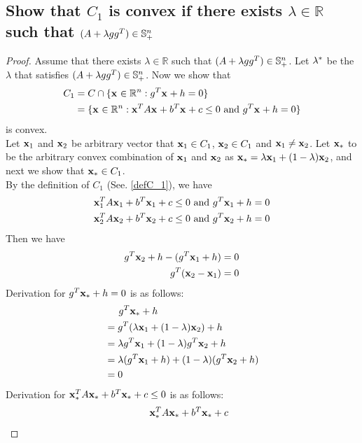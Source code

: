 \documentclass[11pt,a4paper]{article}
\begin{document}
\subsection{Show that $C_1$ is convex if there exists $\lambda \in
    \mathbb{R}$ such that $(A + \lambda gg^T) \in \mathbb{S}_{+}^{n}$}
\begin{proof}
    Assume that there exists $\lambda \in \mathbb{R}$ such that $(A + \lambda gg^T) \in \mathbb{S}_{+}^{n}$.
    Let $\lambda^{*}$ be the $\lambda$ that satisfies $(A + \lambda gg^T) \in \mathbb{S}_{+}^{n}$.
    Now we show that 
    \begin{align}
        C_1 &= C \cap \{\mathbf{x}_{} \in \mathbb{R}^{n}: g^T \mathbf{x}_{} + h = 0\} \\
        &=  \{\mathbf{x}_{} \in \mathbb{R}^{n}: \mathbf{x}_{}^{T} A \mathbf{x}_{} + b^T \mathbf{x}_{} + c \leq 0 \text{ and } g^T \mathbf{x}_{} + h = 0\}
        \label{defC_1}
    \end{align}
    is convex.  \\
    Let $\mathbf{x}_{1}$ and $\mathbf{x}_{2}$ be arbitrary vector that $\mathbf{x}_{1} \in C_1$, $\mathbf{x}_{2} \in C_1$
    and $\mathbf{x}_{1} \not = \mathbf{x}_{2}$. Let $\mathbf{x}_{*}$ to be the arbitrary convex
    combination of $\mathbf{x}_{1}$ and $\mathbf{x}_{2}$ as $\mathbf{x}_{*} = \lambda \mathbf{x}_{1} + (1-\lambda) \mathbf{x}_{2}$, and next we show
    that $\mathbf{x}_{*} \in C_1$. \\
    By the definition of $C_1$ (See. \eqref{defC_1}), we have
    \begin{align}
        \mathbf{x}_{1}^{T} A \mathbf{x}_{1} + b^T \mathbf{x}_{1} + c \leq 0 \text{ and } g^T \mathbf{x}_{1} + h = 0 \\
        \mathbf{x}_{2}^{T} A \mathbf{x}_{2} + b^T \mathbf{x}_{2} + c \leq 0 \text{ and } g^T \mathbf{x}_{2} + h = 0 
    \end{align}
    Then we have
    \begin{align}
        g^T \mathbf{x}_{2} + h - (g^T \mathbf{x}_{1} + h)= 0 \\
        g^T (\mathbf{x}_{2}-\mathbf{x}_{1}) = 0
    \end{align}
    Derivation for $g^T \mathbf{x}_{*} + h = 0$ is as follows:
    \begin{align}
        & \hspace{0.5cm} g^T \mathbf{x}_{*} + h \\
        & = g^T (\lambda \mathbf{x}_{1} + (1-\lambda) \mathbf{x}_{2}) + h \\
        & = \lambda g^T \mathbf{x}_{1} + (1-\lambda)g^T \mathbf{x}_{2} + h \\
        & = \lambda (g^T \mathbf{x}_{1} + h) + (1-\lambda)(g^T \mathbf{x}_{2} + h) \\
        & = 0
    \end{align}
    Derivation for $\mathbf{x}_{*}^{T} A \mathbf{x}_{*} + b^T \mathbf{x}_{*} + c \leq 0$ is as follows:
    \begin{align}
        & \hspace{0.5cm} \quacombo{\x{*}}  \\

\end{align}
\end{proof}
\end{document}
